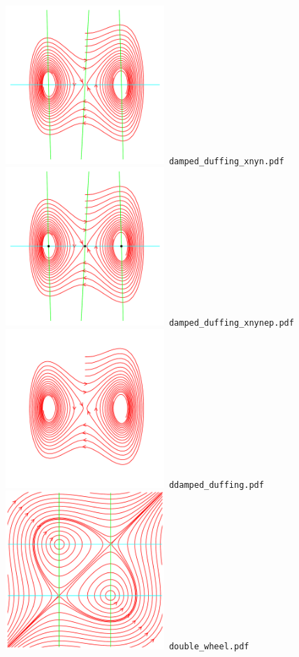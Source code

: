\documentclass[a4paper]{amsart}
\begin{document}
\includegraphics[width=6cm]{damped_duffing_xnyn.pdf}\verb+ damped_duffing_xnyn.pdf+\\
\includegraphics[width=6cm]{damped_duffing_xnynep.pdf}\verb+ damped_duffing_xnynep.pdf+\\
\includegraphics[width=6cm]{ddamped_duffing.pdf}\verb+ ddamped_duffing.pdf+\\
\includegraphics[width=6cm]{double_wheel.pdf}\verb+ double_wheel.pdf+\\
\end{document}

